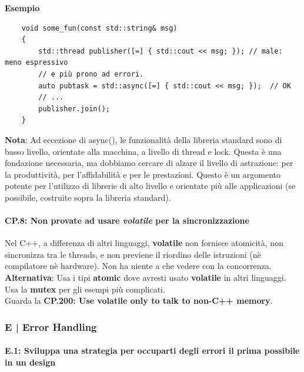 \textsf{\small \textbf{Esempio}}

\begin{lstlisting}
	void some_fun(const std::string& msg)
	{
		std::thread publisher([=] { std::cout << msg; }); // male: meno espressivo
		// e più prono ad errori.
		auto pubtask = std::async([=] { std::cout << msg; });  // OK
		// ...
		publisher.join();
	}
\end{lstlisting}

\textsf{\small \textbf{Nota}: Ad eccezione di async(), le funzionalità della libreria standard sono di basso livello, orientate alla macchina, a livello di thread e lock. Questa è una fondazione necessaria, ma dobbiamo cercare di alzare il livello di astrazione: per la produttività, per l'affidabilità e per le prestazioni. Questo è un argomento potente per l'utilizzo di librerie di alto livello e orientate più alle applicazioni (se possibile, costruite sopra la libreria standard).} \\

\paragraph{CP.8: Non provate ad usare \emph{volatile} per la sincronizzazione}

\textsf{\small Nel C++, a differenza di altri linguaggi, \textbf{volatile} non fornisce atomicità, non sincronizza tra le threads, e non previene il riordino delle istruzioni (nè compilatore nè hardware). Non ha niente a che vedere con la concorrenza.} \\

\textsf{\small \textbf{Alternativa}: Usa i tipi \textbf{atomic} dove avresti usato \textbf{volatile} in altri linguaggi. Usa la \textbf{mutex} per gli esempi più complicati.} \\

\textsf{\small Guarda la \textbf{CP.200: Use volatile only to talk to non-C++ memory}.}

\break


\subsubsection{E | Error Handling}

\paragraph{E.1: Sviluppa una strategia per occuparti degli errori il prima possibile in un design}

